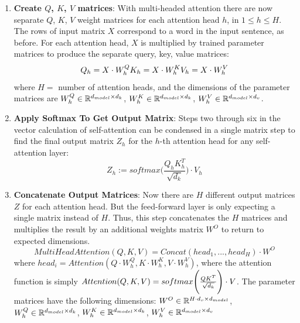 \begin{enumerate}
    \item \textbf{Create $Q$, $K$, $V$ matrices}: With multi-headed attention there are now separate $Q$, $K$, $V$ weight matrices for each attention head $h$, in $1 \leq h \leq H$. The rows of input matrix $X$ correspond to a word in the input sentence, as before. For each attention head, $X$ is multiplied by trained parameter matrices to produce the separate query, key, value matrices: 
    $$
    Q_h = X \cdot W_h^Q \\
    K_h = X \cdot W_h^K \\
    V_h = X \cdot W_h^V 
    $$
    where $H =$ number of attention heads, and the dimensions of the parameter matrices are $\large W_h^Q \in \mathbb{R}^{\Large d_{model} \times d_k}$, $\large W_h^K \in \mathbb{R}^{\Large d_{model} \times d_k}$, $\large W_h^V \in \mathbb{R}^{\Large d_{model} \times d_v}$. 
    
    \item \textbf{Apply Softmax To Get Output Matrix}: Steps two through six in the vector calculation of self-attention can be condensed in a single matrix step to find the final output matrix $Z_h$ for the $h$-th attention head for any self-attention layer:
    $$
    Z_h := softmax \Bigg(\frac {Q_h K_h^T} {\sqrt{d_k}} \Bigg) \cdot V_h
    $$
    
    \item \textbf{Concatenate Output Matrices}: Now there are $H$ different output matrices $Z$ for each attention head. But the feed-forward layer is only expecting a single matrix instead of $H$. Thus, this step concatenates the $H$ matrices and multiplies the result by an additional weights matrix $W^O$ to return to expected dimensions. 
    $$
    MultiHeadAttention(Q, K, V) = Concat(head_1, ..., head_H) \cdot W^O
    $$
    \newline where $head_i = Attention(Q \cdot W_h^Q, K \cdot W_h^K, V \cdot W_h^V)$, where the attention function is simply $Attention(Q, K, V) = softmax \Bigg( \frac {\Large QK^T} {\Large \sqrt{d_k}} \Bigg) \cdot V$. The parameter matrices have the following dimensions:  $W^O \in \mathbb{R}^{\Large H \cdot d_v \times d_{model}}$, $\large W_h^Q \in \mathbb{R}^{\Large d_{model} \times d_k}$, $\large W_h^K \in \mathbb{R}^{\Large d_{model} \times d_k}$, $\large W_h^V \in \mathbb{R}^{\Large d_{model} \times d_v}$
    
    
\end{enumerate}



